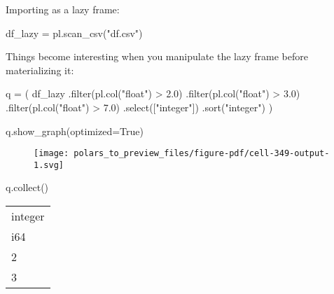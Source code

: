 \documentclass[
  letterpaper,
  DIV=11,
  numbers=noendperiod]{scrartcl}
\newenvironment{Shaded}{\begin{snugshade}}{\end{snugshade}}
\newcommand{\BuiltInTok}[1]{\textcolor[rgb]{0.00,0.23,0.31}{#1}}
\newcommand{\FloatTok}[1]{\textcolor[rgb]{0.68,0.00,0.00}{#1}}
\newcommand{\NormalTok}[1]{\textcolor[rgb]{0.00,0.23,0.31}{#1}}
\newcommand{\OperatorTok}[1]{\textcolor[rgb]{0.37,0.37,0.37}{#1}}
\newcommand{\StringTok}[1]{\textcolor[rgb]{0.13,0.47,0.30}{#1}}
\newcommand{\VariableTok}[1]{\textcolor[rgb]{0.07,0.07,0.07}{#1}}
\begin{document}
Importing as a lazy frame:

\begin{Shaded}
\begin{Highlighting}[]
\NormalTok{df\_lazy }\OperatorTok{=}\NormalTok{ pl.scan\_csv(}\StringTok{"df.csv"}\NormalTok{)}
\end{Highlighting}
\end{Shaded}

Things become interesting when you manipulate the lazy frame before
materializing it:

\begin{Shaded}
\begin{Highlighting}[]
\NormalTok{q }\OperatorTok{=}\NormalTok{ (}
\NormalTok{  df\_lazy}
\NormalTok{  .}\BuiltInTok{filter}\NormalTok{(pl.col(}\StringTok{"float"}\NormalTok{) }\OperatorTok{\textgreater{}} \FloatTok{2.0}\NormalTok{)}
\NormalTok{  .}\BuiltInTok{filter}\NormalTok{(pl.col(}\StringTok{"float"}\NormalTok{) }\OperatorTok{\textgreater{}} \FloatTok{3.0}\NormalTok{)}
\NormalTok{  .}\BuiltInTok{filter}\NormalTok{(pl.col(}\StringTok{"float"}\NormalTok{) }\OperatorTok{\textgreater{}} \FloatTok{7.0}\NormalTok{)}
\NormalTok{  .select([}\StringTok{"integer"}\NormalTok{])}
\NormalTok{  .sort(}\StringTok{"integer"}\NormalTok{)}
\NormalTok{)}

\NormalTok{q.show\_graph(optimized}\OperatorTok{=}\VariableTok{True}\NormalTok{)}
\end{Highlighting}
\end{Shaded}

\begin{figure}[H]

{\centering \texttt{[image: polars\_to\_preview\_files/figure-pdf/cell-349-output-1.svg]}

}

\end{figure}

\begin{Shaded}
\begin{Highlighting}[]
\NormalTok{q.collect()}
\end{Highlighting}
\end{Shaded}

\begin{longtable}[]{@{}l@{}}
\toprule()
integer \\
i64 \\
\midrule()
\endhead
2 \\
3 \\
\bottomrule()
\end{longtable}
\end{document}
